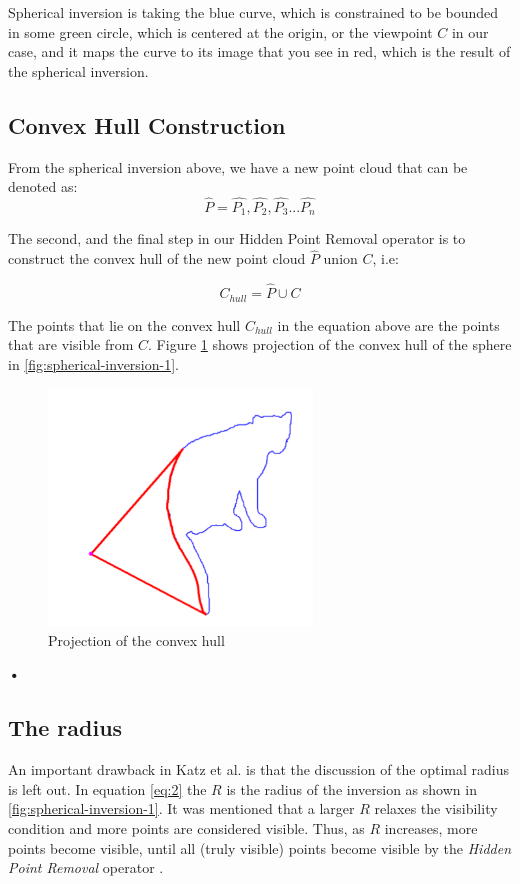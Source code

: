 \documentclass[11pt]{article}
\begin{document}
Spherical inversion is taking the blue curve, which is constrained to be bounded in some green circle, which is centered at the origin, or the viewpoint $C$ in our case, and it maps the curve to its image that you see in red, which is the result of the spherical inversion.

\subsection{Convex Hull Construction}
From the spherical inversion above, we have a new point cloud that can be denoted as:
\begin{equation}
\label{eq:3}
\widehat{P} = \hat{P_{1}},\hat{P_{2}},\hat{P_{3}} ... \hat{P_{n}}
\end{equation}

The second, and the final step in our Hidden Point Removal operator is to construct the  convex hull of the new point cloud $\widehat{P} $ union $C$, i.e:

\begin{equation}
C_{hull} = \widehat{P} \cup C
\end{equation}

The points that lie on the convex hull $C_{hull}$ in the equation above are the points that are visible from $ C $. Figure \ref{fig:spherical-inversion-2} shows projection of the convex hull of the sphere in \ref{fig:spherical-inversion-1}.

\begin{figure}[h]
\includegraphics[width=7cm]{spherical-inversion-2}
\centering
\caption{Projection of the convex hull \cite{Katz07}}
\label{fig:spherical-inversion-2}
\end{figure}\textbf{•}

\subsection{The radius}
\label{section:radius}
An important drawback in Katz et al. \cite{Katz07} is that the discussion of the optimal radius is left out. In equation \ref{eq:2} the $ R $ is the radius of the inversion as shown in \ref{fig:spherical-inversion-1}. It was mentioned that a larger $ R $ relaxes the visibility condition and more points are considered visible. Thus, as $R$ increases, more points become visible, until all (truly visible) points become visible by the \textit{Hidden Point Removal} operator \cite{Katz07}.
\end{document}
